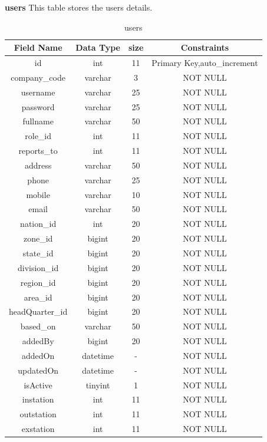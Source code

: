 \textbf{users} This table stores the users details.\nolinebreak
\begin{table}[hp]
\centering
\begin{tabular}{|c|c|c|c|}
\hline
\textbf{Field Name}  & \textbf{Data Type}  & \textbf{size} &\textbf{Constraints}  \\
\hline
 id &	int &	11 & Primary Key,auto\_increment \\\hline
company\_code &	varchar &	3 & NOT NULL \\\hline
username &	varchar &	25 & NOT NULL \\\hline
password &	varchar &	25 & NOT NULL \\\hline
fullname &	varchar &	50 & NOT NULL \\\hline
role\_id &	int &	11 & NOT NULL \\\hline
reports\_to &	int &	11 & NOT NULL \\\hline
address &	varchar &	50 & NOT NULL \\\hline
phone &	varchar	 & 25 & NOT NULL \\\hline
mobile &	varchar &	10 & NOT NULL \\\hline
email &	varchar &	50 & NOT NULL \\\hline
nation\_id &	int &	20 & NOT NULL \\\hline
zone\_id &	bigint &	20 & NOT NULL \\\hline
state\_id &	bigint &	20 & NOT NULL \\\hline
division\_id &	bigint &	20 & NOT NULL \\\hline
region\_id &	bigint &	20 & NOT NULL \\\hline
area\_id &	bigint &	20 & NOT NULL \\\hline
headQuarter\_id &	bigint &	20 & NOT NULL \\\hline
based\_on &	varchar &	50 & NOT NULL \\\hline
addedBy &	bigint &	20 & NOT NULL \\\hline
addedOn &	datetime &	- & NOT NULL \\\hline
updatedOn &	datetime &	- & NOT NULL \\\hline
 isActive &	tinyint &	1 & NOT NULL \\\hline
instation &	int &	11 & NOT NULL \\\hline
outstation &	int &	11 & NOT NULL \\\hline
exstation &	int &	11 & NOT NULL \\\hline

\end{tabular}
\caption{users}
\end{table}

